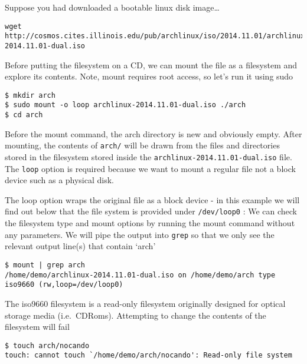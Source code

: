 Suppose you had downloaded a bootable linux disk image\ldots{}

\begin{verbatim}
wget http://cosmos.cites.illinois.edu/pub/archlinux/iso/2014.11.01/archlinux-2014.11.01-dual.iso
\end{verbatim}

Before putting the filesystem on a CD, we can mount the file as a
filesystem and explore its contents. Note, mount requires root access,
so let's run it using sudo

\begin{verbatim}
$ mkdir arch
$ sudo mount -o loop archlinux-2014.11.01-dual.iso ./arch
$ cd arch
\end{verbatim}

Before the mount command, the arch directory is new and obviously empty.
After mounting, the contents of \texttt{arch/} will be drawn from the
files and directories stored in the filesystem stored inside the
\texttt{archlinux-2014.11.01-dual.iso} file.\\The \texttt{loop} option
is required because we want to mount a regular file not a block device
such as a physical disk.

The loop option wraps the original file as a block device - in this
example we will find out below that the file system is provided under
\texttt{/dev/loop0} : We can check the filesystem type and mount options
by running the mount command without any parameters. We will pipe the
output into \texttt{grep} so that we only see the relevant output
line(s) that contain `arch'

\begin{verbatim}
$ mount | grep arch
/home/demo/archlinux-2014.11.01-dual.iso on /home/demo/arch type iso9660 (rw,loop=/dev/loop0)
\end{verbatim}

The iso9660 filesystem is a read-only filesystem originally designed for
optical storage media (i.e.~CDRoms). Attempting to change the contents
of the filesystem will fail

\begin{verbatim}
$ touch arch/nocando
touch: cannot touch `/home/demo/arch/nocando': Read-only file system
\end{verbatim}
